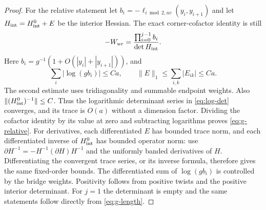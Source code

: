 \begin{proof}
For the relative statement let $b_i=-\ell_{i\bmod2,uv}(y_i,y_{i+1})$
and let $H_{\rm int}=H^0_{\rm int}+E$ be the interior Hessian. The exact
corner-cofactor identity is still
\[
       -W_{uv}=\frac{\prod_{i=0}^{j-1}b_i}{\det H_{\rm int}}.
\]
Here $b_i=g^{-1}(1+O(|y_i|+|y_{i+1}|))$, and
\[
 \sum_i|\log(gb_i)|\le Ca,\qquad
 \|E\|_1\le\sum_{i,k}|E_{ik}|\le Ca.
\]
The second estimate uses tridiagonality and summable endpoint weights.
Also $\|(H^0_{\rm int})^{-1}\|\le C$. Thus the logarithmic determinant
series in \eqref{eq:log-det} converges, and its trace is $O(a)$ without
a dimension factor. Dividing the cofactor identity by its value at zero
and subtracting logarithms proves \eqref{eq:g-relative}.
For derivatives, each differentiated $E$ has bounded trace norm, and
each differentiated inverse of $H^0_{\rm int}$ has bounded operator
norm: use $\partial H^{-1}=-H^{-1}(\partial H)H^{-1}$ and the uniformly
banded derivatives of $H$. Differentiating the convergent trace series,
or its inverse formula, therefore gives the same fixed-order bounds.
The differentiated sum of $\log(gb_i)$ is controlled by the bridge
weights. Positivity follows from positive twists and the positive
interior determinant. For $j=1$ the determinant is empty and the same
statements follow directly from \eqref{eq:g-length}.
\end{proof}
